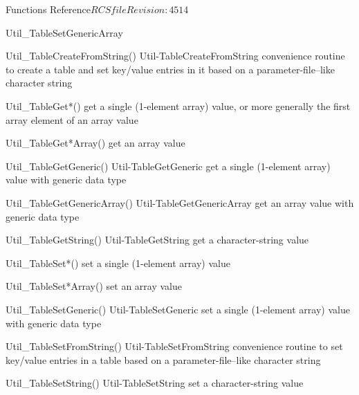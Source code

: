 \begin{cactuspart}{ Functions Reference}{$RCSfile$}{$Revision: 4514 $}
\begin{FunctionDescription}{Util\_TableSetGenericArray}
\begin{SeeAlsoSection}
\begin{SeeAlso2} {Util\_TableCreateFromString()} {Util-TableCreateFromString}
convenience routine to create a table and set key/value entries
in it based on a parameter-file--like character string
\end{SeeAlso2}
\begin{SeeAlso}{Util\_TableGet*()}
get a single (1-element array) value,
or more generally the first array element of an array value
\end{SeeAlso}
\begin{SeeAlso}{Util\_TableGet*Array()}
get an array value
\end{SeeAlso}
\begin{SeeAlso2} {Util\_TableGetGeneric()} {Util-TableGetGeneric}
get a single (1-element array) value with generic data type
\end{SeeAlso2}
\begin{SeeAlso2} {Util\_TableGetGenericArray()} {Util-TableGetGenericArray}
get an array value with generic data type
\end{SeeAlso2}
\begin{SeeAlso2} {Util\_TableGetString()} {Util-TableGetString}
get a character-string value
\end{SeeAlso2}
\begin{SeeAlso}{Util\_TableSet*()}
set a single (1-element array) value
\end{SeeAlso}
\begin{SeeAlso}{Util\_TableSet*Array()}
set an array value
\end{SeeAlso}
\begin{SeeAlso2} {Util\_TableSetGeneric()} {Util-TableSetGeneric}
set a single (1-element array) value with generic data type
\end{SeeAlso2}
\begin{SeeAlso2} {Util\_TableSetFromString()} {Util-TableSetFromString}
convenience routine to set key/value entries in a table based on a
parameter-file--like character string
\end{SeeAlso2}
\begin{SeeAlso2} {Util\_TableSetString()} {Util-TableSetString}
set a character-string value
\end{SeeAlso2}
\end{SeeAlsoSection}


\end{FunctionDescription}
\end{cactuspart}
